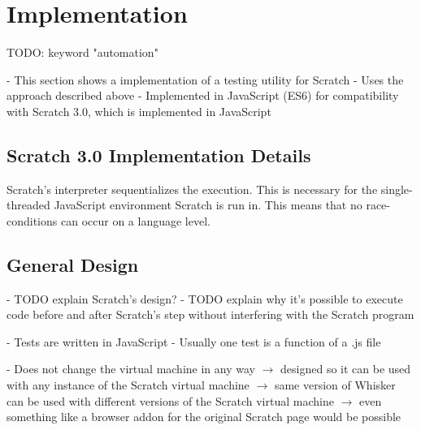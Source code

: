 


\chapter{Implementation}

TODO: keyword "automation"

- This section shows a implementation of a testing utility for Scratch
- Uses the approach described above
- Implemented in JavaScript (ES6) for compatibility with Scratch 3.0, which is implemented in JavaScript

\section {Scratch 3.0 Implementation Details}

Scratch's interpreter sequentializes the execution.
This is necessary for the single-threaded JavaScript environment Scratch is run in.
This means that no race-conditions can occur on a language level.

\section{General Design}

- TODO explain Scratch's design?
- TODO explain why it's possible to execute code before and after Scratch's step without interfering with the Scratch program

- Tests are written in JavaScript
- Usually one test is a function of a .js file

- Does not change the virtual machine in any way
    $\rightarrow$ designed so it can be used with any instance of the Scratch virtual machine
    $\rightarrow$ same version of Whisker can be used with different versions of the Scratch virtual machine
    $\rightarrow$ even something like a browser addon for the original Scratch page would be possible

